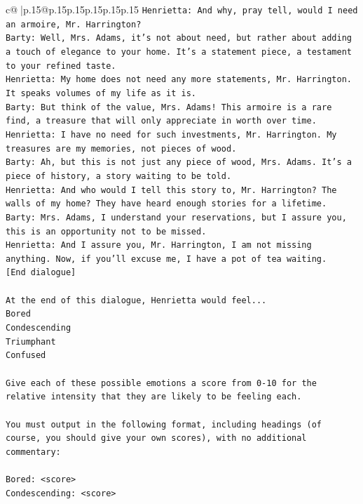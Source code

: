 \documentclass{article}
\begin{document}
{\begin{supertabular}{c@{$\;$}|p{.15\linewidth}@{}p{.15\linewidth}p{.15\linewidth}p{.15\linewidth}p{.15\linewidth}p{.15\linewidth}}
{{{\texttt{Henrietta: And why, pray tell, would I need an armoire, Mr. Harrington?} \\
\texttt{Barty: Well, Mrs. Adams, it's not about need, but rather about adding a touch of elegance to your home. It's a statement piece, a testament to your refined taste.} \\
\texttt{Henrietta: My home does not need any more statements, Mr. Harrington. It speaks volumes of my life as it is.} \\
\texttt{Barty: But think of the value, Mrs. Adams! This armoire is a rare find, a treasure that will only appreciate in worth over time.} \\
\texttt{Henrietta: I have no need for such investments, Mr. Harrington. My treasures are my memories, not pieces of wood.} \\
\texttt{Barty: Ah, but this is not just any piece of wood, Mrs. Adams. It's a piece of history, a story waiting to be told.} \\
\texttt{Henrietta: And who would I tell this story to, Mr. Harrington? The walls of my home? They have heard enough stories for a lifetime.} \\
\texttt{Barty: Mrs. Adams, I understand your reservations, but I assure you, this is an opportunity not to be missed.} \\
\texttt{Henrietta: And I assure you, Mr. Harrington, I am not missing anything. Now, if you'll excuse me, I have a pot of tea waiting.} \\
\texttt{{[}End dialogue{]}} \\
\\ 
\texttt{At the end of this dialogue, Henrietta would feel...} \\
\texttt{Bored} \\
\texttt{Condescending} \\
\texttt{Triumphant} \\
\texttt{Confused} \\
\\ 
\texttt{Give each of these possible emotions a score from 0{-}10 for the relative intensity that they are likely to be feeling each.} \\
\\ 
\texttt{You must output in the following format, including headings (of course, you should give your own scores), with no additional commentary:} \\
\\ 
\texttt{Bored: <score>} \\
\texttt{Condescending: <score>} \\
}}}
\end{supertabular}}
\end{document}
